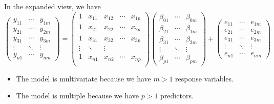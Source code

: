 \begin{refsection}
\begin{definition}
In the expanded view, we have
$$\begin{pmatrix}
y_{11} & \cdots & y_{1m}\\ 
y_{21} & \cdots & y_{2m}\\
y_{31} & \cdots & y_{3m}\\
\vdots & \ddots & \vdots\\ 
y_{n1} & \cdots & y_{nm}
\end{pmatrix} = \begin{pmatrix}
1 & x_{11} & x_{12} & \cdots & x_{1p}\\ 
1 & x_{21} & x_{22} & \cdots & x_{2p}\\
1 & x_{31} & x_{32} & \cdots & x_{3p}\\
\vdots & \ddots & \vdots\\ 
1 & x_{n1} & x_{n2} & \cdots & x_{np}\\
\end{pmatrix}\begin{pmatrix}
	\beta_{01} & \cdots & \beta_{0m}\\ 
	\beta_{21} & \cdots & \beta_{1m}\\
	\beta_{31} & \cdots & \beta_{2m}\\
	\vdots & \ddots & \vdots\\ 
	\beta_{p1} & \cdots & \beta_{pm}
\end{pmatrix} + \begin{pmatrix}
e_{11} & \cdots & e_{1m}\\ 
e_{21} & \cdots & e_{2m}\\
e_{31} & \cdots & e_{3m}\\
\vdots & \ddots & \vdots\\ 
e_{n1} & \cdots & e_{nm}
\end{pmatrix} $$
\end{definition}


\begin{remark}\hfill
\begin{itemize}
	\item The model is multivariate because we have $m > 1$ response variables.
	\item The model is multiple because we have $p > 1$ predictors. 
\end{itemize}	
\end{remark}



\end{refsection}

